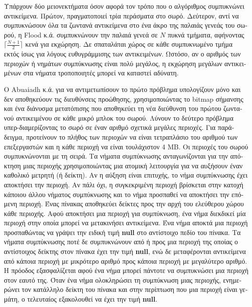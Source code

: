 \begin{greek}
Υπάρχουν δύο μειονεκτήματα όσον αφορά τον τρόπο που ο αλγόριθμος
συμπυκνώνει αντικείμενα. Πρώτον, πραγματοποιεί τρία περάσματα
στο σωρό. Δεύτερον, αντί να συμπυκνώσουν όλα τα ζωντανά αντικείμενα
στο ένα άκρο της παλαιάς γενεάς του σωρού, η Flood κ.ά. συμπυκνώνουν
την παλαιά γενεά σε $N$ πυκνά τμήματα, αφήνοντας $\lceil{\frac{N+1}{2}}\rceil$
κενά για εκχώρηση. Δε σπαταλάται χώρος σε κάθε συμπυκνωμένο τμήμα
εκτός ίσως για λόγους ευθυγράμμισης των αντικειμένων. Ωστόσο, αν
ο αριθμός των περιοχών ή νημάτων συμπύκνωσης είναι πολύ μεγάλος,
η εκχώρηση μεγάλων αντικειμένων στα νήματα τροποποιητές μπορεί
να καταστεί αδύνατη.

Ο Abuaiadh κ.ά. \cite{DBLP:conf/oopsla/AbuaiadhOPS04} για να αντιμετωπίσουν
το πρώτο πρόβλημα υπολογίζουν μόνο και δεν αποθηκεύουν τις διευθύνσεις
προώθησης, χρησιμοποιώντας το bitmap σήμανσης και ένα διάνυσμα
μετατόπισης που αποθηκεύει τη νέα διεύθυνση του πρώτου ζωντανού
αντικειμένου σε κάθε μικρό μπλοκ του σωρού. Λύνουν το δεύτερο πρόβλημα
υπερ-διαμερίζοντας το σωρό σε έναν αριθμό σχετικά μεγάλες περιοχές.
Για παράδειγμα, προτείνουν το πλήθος των περιοχών να είναι τετραπλάσιο
του αριθμού των επεξεργαστών και η κάθε περιοχή να είναι τουλάχιστον
4 MB. Οι περιοχές του σωρού συμπυκνώνονται με τη σειρά. Τα νήματα
συμπύκνωσης ανταγωνίζονται για την απόκτηση μιας περιοχής χρησιμοποιώντας
μια ατομική λειτουργία για να αυξήσουν έναν καθολικό μετρητή (ή
δείκτη). Αν η αύξηση είναι επιτυχής, το νήμα συμπύκνωσης έχει
αποκτήσει την περιοχή. Αν πάλι όχι, η συγκεκριμένη περιοχή βρίσκεται
στην κατοχή κάποιου άλλου νήματος συμπύκνωσης και το νήμα προσπαθεί
να αποκτήσει την επόμενη περιοχή. Ένας πίνακας αποθηκεύει δείκτες
προς την αρχή του ελεύθερου χώρου κάθε περιοχής. Αφού αποκτήσει
μια περιοχή για συμπύκνωση, ένα νήμα διεκδικεί μία περιοχή στην
οποία μπορεί να μετακινήσει αντικείμενα. Ένα νήμα αποκτά μια
περιοχή προσπαθώντας να γράψει την ειδική τιμή \textbf{null}
στο αντίστοιχο πεδίο του πίνακα. Τα νήματα συμπύκνωσης ποτέ δε
συμπυκνώνουν από ή προς μια περιοχή της οποίας ο αντίστοιχος
δείκτης στον πίνακα έχει την τιμή \textbf{null}, ενώ δε μεταφέρονται
αντικείμενα από κάποια περιοχή με μικρότερο αριθμό προς κάποια
περιοχή με μεγαλύτερο αριθμό. Η πρόοδος εξασφαλίζεται αφού ένα
νήμα μπορεί πάντοτε να συμπυκνώσει μια περιοχή στον εαυτό της.
Όταν ένα νήμα ολοκληρώσει τη συμπύκνωση μιας περιοχής, ενημερώνει
τον κατάλληλο δείκτη του πίνακα και στην περίπτωση που μια περιοχή
είναι γεμάτη, ο τελευταίος εξακολουθεί να έχει την τιμή \textbf{null}.


\end{greek}
